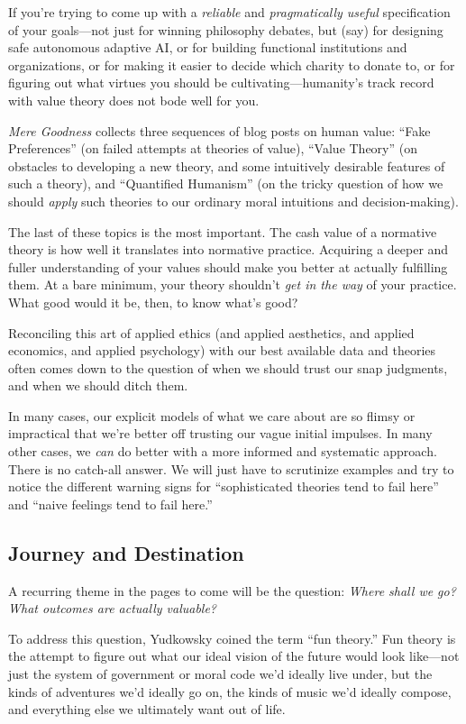 {
 If you're trying to come up with a
\textit{reliable} and \textit{pragmatically useful} specification of
your goals---not just for winning philosophy debates, but (say) for
designing safe autonomous adaptive AI, or for building functional
institutions and organizations, or for making it easier to decide which
charity to donate to, or for figuring out what virtues you should be
cultivating---humanity's track record with value theory
does not bode well for you.}

{
 \textit{Mere Goodness} collects three sequences of blog posts on
human value: ``Fake Preferences''
(on failed attempts at theories of value), ``Value
Theory'' (on obstacles to developing a new theory,
and some intuitively desirable features of such a theory), and
``Quantified Humanism'' (on the
tricky question of how we should \textit{apply} such theories to our
ordinary moral intuitions and decision-making).}

{
 The last of these topics is the most important. The cash value of
a normative theory is how well it translates into normative practice.
Acquiring a deeper and fuller understanding of your values should make
you better at actually fulfilling them. At a bare minimum, your theory
shouldn't \textit{get in the way} of your practice.
What good would it be, then, to know what's good?}

{
 Reconciling this art of applied ethics (and applied aesthetics,
and applied economics, and applied psychology) with our best available
data and theories often comes down to the question of when we should
trust our snap judgments, and when we should ditch them.}

{
 In many cases, our explicit models of what we care about are so
flimsy or impractical that we're better off trusting
our vague initial impulses. In many other cases, we \textit{can} do
better with a more informed and systematic approach. There is no
catch-all answer. We will just have to scrutinize examples and try to
notice the different warning signs for ``sophisticated
theories tend to fail here'' and
``naive feelings tend to fail
here.''}

\subsection{Journey and Destination}

{
 A recurring theme in the pages to come will be the question:
\textit{Where shall we go? What outcomes are actually valuable?}}

{
 To address this question, Yudkowsky coined the term
``fun theory.'' Fun theory is the
attempt to figure out what our ideal vision of the future would look
like---not just the system of government or moral code
we'd ideally live under, but the kinds of adventures
we'd ideally go on, the kinds of music
we'd ideally compose, and everything else we ultimately
want out of life.}

